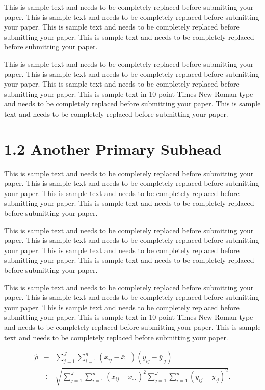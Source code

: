 \documentclass[]{asaproc}
\begin{document}
This is sample text and needs to be completely replaced before
submitting your paper. This is sample text and needs to be completely
replaced before submitting your paper. This is sample text and needs to
be completely replaced before submitting your paper. This is sample text
and needs to be completely replaced before submitting your paper.

This is sample text and needs to be completely replaced before
submitting your paper. This is sample text and needs to be completely
replaced before submitting your paper. This is sample text and needs to
be completely replaced before submitting your paper. This is sample text
in 10-point Times New Roman type and needs to be completely replaced
before submitting your paper. This is sample text and needs to be
completely replaced before submitting your paper.

\section*{1.2 Another Primary Subhead}

This is sample text and needs to be completely replaced before
submitting your paper. This is sample text and needs to be completely
replaced before submitting your paper. This is sample text and needs to
be completely replaced before submitting your paper. This is sample text
and needs to be completely replaced before submitting your paper.

This is sample text and needs to be completely replaced before
submitting your paper. This is sample text and needs to be completely
replaced before submitting your paper. This is sample text and needs to
be completely replaced before submitting your paper. This is sample text
and needs to be completely replaced before submitting your paper.

This is sample text and needs to be completely replaced before
submitting your paper. This is sample text and needs to be completely
replaced before submitting your paper. This is sample text and needs to
be completely replaced before submitting your paper. This is sample text
in 10-point Times New Roman type and needs to be completely replaced
before submitting your paper. This is sample text and needs to be
completely replaced before submitting your paper.

\begin{eqnarray}
\hat{\rho} & \equiv & \sum_{j=1}^J
\sum_{i=1}^n (x_{ij} - \bar{x}_{\cdot \cdot})(y_{ij} - \bar{y}_{\cdot
j}) \nonumber \\
& \div & \sqrt{
\sum_{j=1}^J \sum_{i=1}^n (x_{ij} - \bar{x}_{\cdot \cdot})^2
\sum_{j=1}^J \sum_{i=1}^n (y_{ij} - \bar{y}_{\cdot j})^2
}
. \nonumber
\end{eqnarray}
\end{document}
